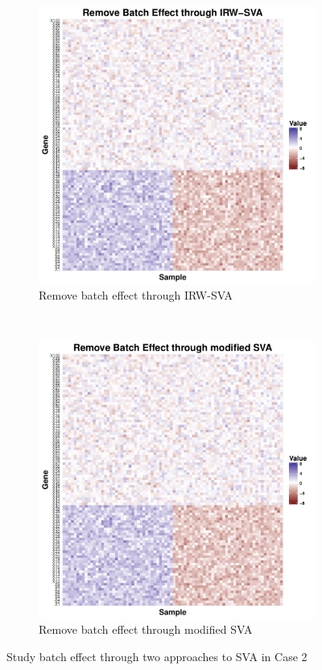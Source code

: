 \documentclass[11pt]{article}
\begin{document}
\begin{figure}[h!]
\begin{subfigure}[b]{0.31\textwidth}
        \includegraphics[width = \textwidth]{figures/sva2.pdf}
        \caption{Remove batch effect through IRW-SVA}
        \label{fig:sva2}
    \end{subfigure}  %
~
    \begin{subfigure}[b]{0.31\textwidth}
        \centering
        \includegraphics[width = \textwidth]{figures/new_sva2.pdf}
        \caption{Remove batch effect through modified SVA}
        \label{fig:new_sva2}
    \end{subfigure}    
    \caption{Study batch effect through two approaches to SVA in Case 2}
    \label{fig:svas2}
\end{figure}
\end{document}
